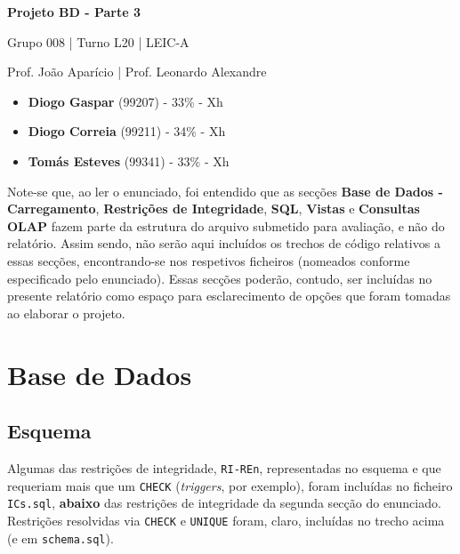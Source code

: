 \documentclass[12pt,a4paper]{article}
\begin{document}
\begin{titlepage}
  \begin{center}
    \vspace*{5cm}

    \Huge
    \textbf{Projeto BD - Parte 3}

    \vspace{0.5cm}
    \LARGE
    Grupo 008 | Turno L20 | LEIC-A

    \vspace{0.5cm}
    \large
    Prof. João Aparício | Prof. Leonardo Alexandre

    \vfill
  \end{center}
  \large
  \begin{itemize}
    \item[] \textbf{Diogo Gaspar} (99207) - 33\% - Xh
    \item[] \textbf{Diogo Correia} (99211) - 34\% - Xh
    \item[] \textbf{Tomás Esteves} (99341) - 33\% - Xh
  \end{itemize}
\end{titlepage}

Note-se que, ao ler o enunciado, foi entendido que as secções
\textbf{Base de Dados - Carregamento}, \textbf{Restrições de Integridade},
\textbf{SQL}, \textbf{Vistas} e \textbf{Consultas OLAP} fazem parte da estrutura
do arquivo submetido para avaliação, e não do relatório. Assim sendo, não serão aqui
incluídos os trechos de código relativos a essas secções, encontrando-se nos
respetivos ficheiros (nomeados conforme especificado pelo enunciado). Essas
secções poderão, contudo, ser incluídas no presente relatório como espaço para
esclarecimento de opções que foram tomadas ao elaborar o projeto.

\section*{Base de Dados}

\subsection*{Esquema}




Algumas das restrições de integridade, \texttt{RI-REn}, representadas no esquema
e que requeriam mais que um \texttt{CHECK} (\textit{triggers}, por exemplo), foram
incluídas no ficheiro \texttt{ICs.sql}, \textbf{abaixo} das restrições de integridade
da segunda secção do enunciado. Restrições resolvidas via \texttt{CHECK} e
\texttt{UNIQUE} foram, claro, incluídas no trecho acima (e em \texttt{schema.sql}).
\end{document}
